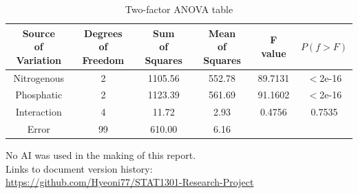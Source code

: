 \documentclass[12pt]{article}
\begin{document}
\newpage

\printbibliography

\newpage

\appendix

\begin{table}[ht]
    \centering
    \caption{Two-factor ANOVA table}
    \begin{tabular}{cccccc}
    \hline
    \makecell{Source\\ of Variation} & \makecell{Degrees\\ of Freedom} & \makecell{Sum\\ of Squares} &  \makecell{Mean\\ of Squares} & F value & \(P(f > F)\)\\ \hline
    Nitrogenous & 2 & 1105.56 & 552.78 & 89.7131 & \(<\)2e-16\\
    Phosphatic & 2 & 1123.39 & 561.69 & 91.1602 & \(<\)2e-16\\
    Interaction & 4 & 11.72 & 2.93 & 0.4756 & 0.7535\\
    Error & 99 & 610.00 & 6.16\\ \hline
    \end{tabular}
\end{table}

No AI was used in the making of this report.\\
Links to document version history:\\
\hspace*{1em} \url{https://github.com/Hyeoni77/STAT1301-Research-Project}

\newpage
\end{document}
